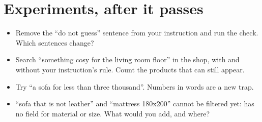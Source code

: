\documentclass[11pt]{article}
\begin{document}
\section{Experiments, after it passes}

\begin{itemize}[leftmargin=1.4em, itemsep=3pt]
\item Remove the ``do not guess'' sentence from your instruction and
  run the check. Which sentences change?
\item Search ``something cosy for the living room floor'' in the shop,
  with and without your instruction's rule. Count the products that
  can still appear.
\item Try ``a sofa for less than three thousand''. Numbers in words
  are a new trap.
\item ``sofa that is not leather'' and ``mattress 180x200'' cannot be
  filtered yet:  has no field for material or size.
  What would you add, and where?
\end{itemize}
\end{document}
